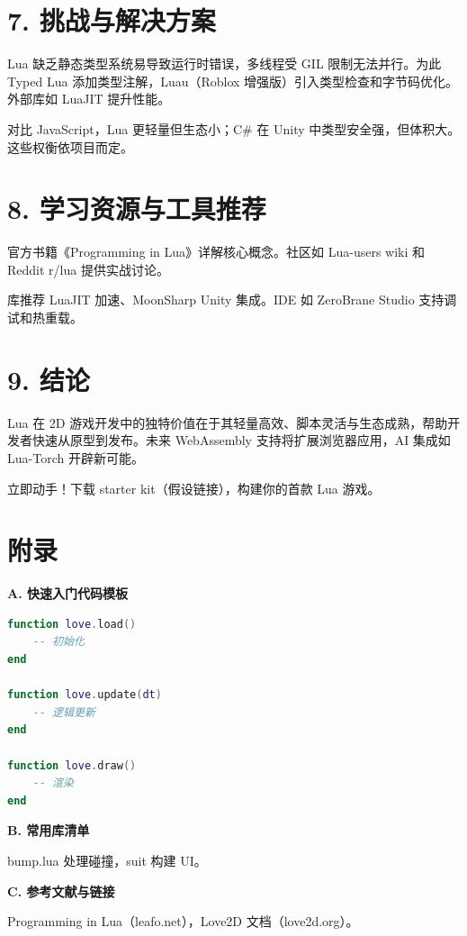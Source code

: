 \chapter{7. 挑战与解决方案}
Lua 缺乏静态类型系统易导致运行时错误，多线程受 GIL 限制无法并行。为此 Typed Lua 添加类型注解，Luau（Roblox 增强版）引入类型检查和字节码优化。外部库如 LuaJIT 提升性能。\par
对比 JavaScript，Lua 更轻量但生态小；C\#{} 在 Unity 中类型安全强，但体积大。这些权衡依项目而定。\par
\chapter{8. 学习资源与工具推荐}
官方书籍《Programming in Lua》详解核心概念。社区如 Lua-users wiki 和 Reddit r/lua 提供实战讨论。\par
库推荐 LuaJIT 加速、MoonSharp Unity 集成。IDE 如 ZeroBrane Studio 支持调试和热重载。\par
\chapter{9. 结论}
Lua 在 2D 游戏开发中的独特价值在于其轻量高效、脚本灵活与生态成熟，帮助开发者快速从原型到发布。未来 WebAssembly 支持将扩展浏览器应用，AI 集成如 Lua-Torch 开辟新可能。\par
立即动手！下载 starter kit（假设链接），构建你的首款 Lua 游戏。\par
\chapter{附录}
\textbf{A. 快速入门代码模板}\par
\begin{lstlisting}[language=lua]
function love.load()
    -- 初始化
end

function love.update(dt)
    -- 逻辑更新
end

function love.draw()
    -- 渲染
end
\end{lstlisting}
\textbf{B. 常用库清单}\par
bump.lua 处理碰撞，suit 构建 UI。\par
\textbf{C. 参考文献与链接}\par
Programming in Lua（leafo.net），Love2D 文档（love2d.org）。\par
